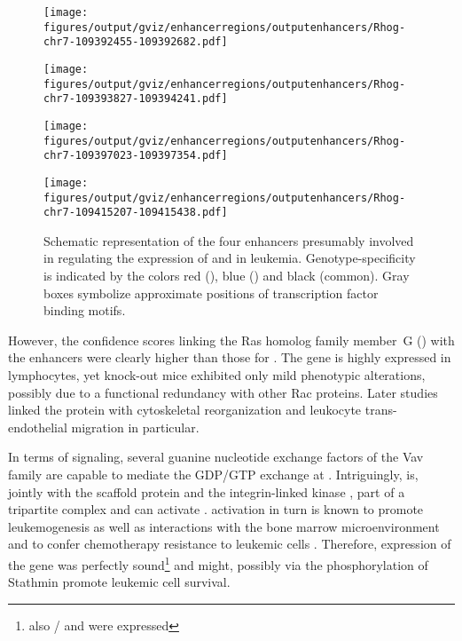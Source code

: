 \begin{figure}[!t]
	\begin{minipage}{0.5\textwidth}
		\texttt{[image: figures/output/gviz/enhancerregions/outputenhancers/Rhog-chr7-109392455-109392682.pdf]} 
	\end{minipage}
	\begin{minipage}{0.5\textwidth}
      	\texttt{[image: figures/output/gviz/enhancerregions/outputenhancers/Rhog-chr7-109393827-109394241.pdf]} 
	\end{minipage}
		\begin{minipage}{0.5\textwidth}
			\texttt{[image: figures/output/gviz/enhancerregions/outputenhancers/Rhog-chr7-109397023-109397354.pdf]} 
		\end{minipage}
		\begin{minipage}{0.5\textwidth}
			\texttt{[image: figures/output/gviz/enhancerregions/outputenhancers/Rhog-chr7-109415207-109415438.pdf]} 
		\end{minipage}
	\caption{Schematic representation of the four enhancers presumably involved in regulating the expression of  and   in \mllafnine leukemia. Genotype-specificity is indicated by the colors red (\dnmtchipregular), blue (\dnmtwtregular) and black (common). Gray boxes symbolize approximate positions of transcription factor binding motifs.}
	\label{fig:enhancers:rhognup98:enh}
\end{figure}

However, the confidence scores linking the  Ras homolog family member~G () with the enhancers were clearly higher than those for . The gene is highly expressed in lymphocytes, yet knock-out mice exhibited only mild phenotypic alterations, possibly due to  a functional redundancy with other Rac proteins\cite{Vigorito2004}. Later studies linked the protein  with cytoskeletal reorganization and leukocyte trans-endothelial migration in particular\cite{Buul2007}.  

In terms of signaling, several guanine nucleotide exchange factors of the Vav family are capable to mediate the GDP/GTP exchange at \cite{Tybulewicz2005}. Intriguingly,  is, jointly with the  scaffold protein  and the integrin-linked kinase , part of a tripartite complex and can activate \cite{Jackson2015}.  activation in turn is known to promote leukemogenesis as well as interactions with the bone marrow microenvironment\cite{Wang2013} and to confer chemotherapy resistance to \mllafnine leukemic cells\cite{Nimmagadda2018} . Therefore, expression of the  gene was perfectly sound\footnote{also / and  were expressed} and might, possibly via the  phosphorylation of Stathmin promote leukemic cell survival.

